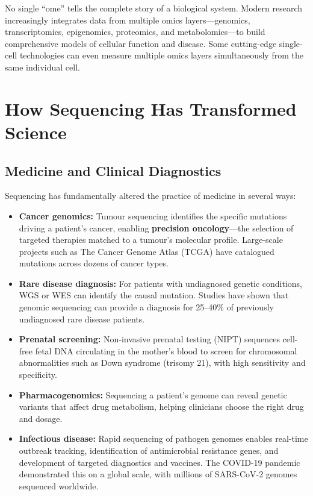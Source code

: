 \begin{keyconcept}[title={Multi-Omics}]
No single ``ome'' tells the complete story of a biological system. Modern research increasingly integrates data from multiple omics layers---genomics, transcriptomics, epigenomics, proteomics, and metabolomics---to build comprehensive models of cellular function and disease. Some cutting-edge single-cell technologies can even measure multiple omics layers simultaneously from the same individual cell.
\end{keyconcept}


\section{How Sequencing Has Transformed Science}
\label{sec:intro:transformations}

\subsection{Medicine and Clinical Diagnostics}
\label{subsec:intro:medicine}

Sequencing has fundamentally altered the practice of medicine in several ways:

\begin{itemize}[itemsep=3pt]
  \item \textbf{Cancer genomics:} Tumour sequencing identifies the specific mutations driving a patient's cancer, enabling \textbf{precision oncology}---the selection of targeted therapies matched to a tumour's molecular profile. Large-scale projects such as The Cancer Genome Atlas (TCGA) have catalogued mutations across dozens of cancer types.
  \item \textbf{Rare disease diagnosis:} For patients with undiagnosed genetic conditions, \acrfull{WGS} or \acrfull{WES} can identify the causal mutation. Studies have shown that genomic sequencing can provide a diagnosis for 25--40\% of previously undiagnosed rare disease patients.
  \item \textbf{Prenatal screening:} Non-invasive prenatal testing (NIPT) sequences cell-free fetal DNA circulating in the mother's blood to screen for chromosomal abnormalities such as Down syndrome (trisomy 21), with high sensitivity and specificity.
  \item \textbf{Pharmacogenomics:} Sequencing a patient's genome can reveal genetic variants that affect drug metabolism, helping clinicians choose the right drug and dosage.
  \item \textbf{Infectious disease:} Rapid sequencing of pathogen genomes enables real-time outbreak tracking, identification of antimicrobial resistance genes, and development of targeted diagnostics and vaccines. The COVID-19 pandemic demonstrated this on a global scale, with millions of SARS-CoV-2 genomes sequenced worldwide.
\end{itemize}

